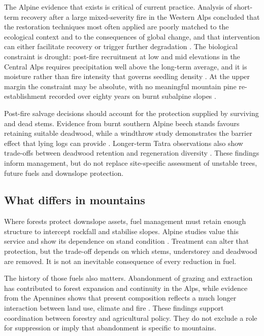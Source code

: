 \documentclass[11pt,a4paper]{article}
\begin{document}
The Alpine evidence that exists is critical of current practice. Analysis of short-term recovery after a large mixed-severity fire in the Western Alps concluded that the restoration techniques most often applied are poorly matched to the ecological context and to the consequences of global change, and that intervention can either facilitate recovery or trigger further degradation \citep{mantero_short-term_2023}. The biological constraint is drought: post-fire recruitment at low and mid elevations in the Central Alps requires precipitation well above the long-term average, and it is moisture rather than fire intensity that governs seedling density \citep{moser_potential_2010}. At the upper margin the constraint may be absolute, with no meaningful mountain pine re-establishment recorded over eighty years on burnt subalpine slopes \citep{degiuli_arrested_2024}.

Post-fire salvage decisions should account for the protection supplied by surviving and dead stems. Evidence from burnt southern Alpine beech stands favours retaining suitable deadwood, while a windthrow study demonstrates the barrier effect that lying logs can provide \citep{maringer_temporal_2016, costa_biological_2021}. Longer-term Tatra observations also show trade-offs between deadwood retention and regeneration diversity \citep{seben_impact_2024}. These findings inform management, but do not replace site-specific assessment of unstable trees, future fuels and downslope protection.

\subsection{What differs in mountains}

Where forests protect downslope assets, fuel management must retain enough structure to intercept rockfall and stabilise slopes. Alpine studies value this service and show its dependence on stand condition \citep{accastello_asforesee_2019, moos_climate_2021}. Treatment can alter that protection, but the trade-off depends on which stems, understorey and deadwood are removed. It is not an inevitable consequence of every reduction in fuel.

The history of those fuels also matters. Abandonment of grazing and extraction has contributed to forest expansion and continuity in the Alps, while evidence from the Apennines shows that present composition reflects a much longer interaction between land use, climate and fire \citep{bebi_changes_2017, garbarino_contrasting_2020, moralesmolino_longterm_2021}. These findings support coordination between forestry and agricultural policy. They do not exclude a role for suppression or imply that abandonment is specific to mountains.
\end{document}
